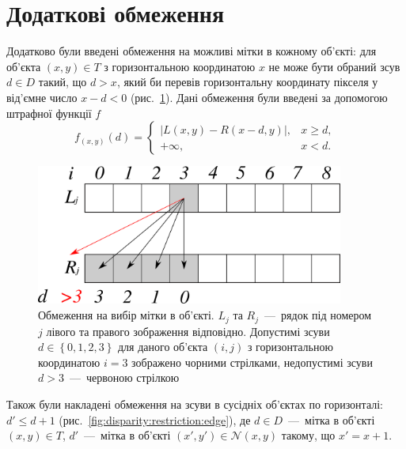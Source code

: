 \section{Додаткові обмеження}

Додатково були введені обмеження на можливі мітки в кожному об'єкті:
для об'єкта $\left( x, y \right) \in T$ з горизонтальною координатою $x$
не може бути обраний зсув $d \in D$ такий, що $d > x$,
який би перевів горизонтальну координату пікселя у від'ємне число
$x - d < 0$ (рис.~\ref{fig:disparity:restriction:vertex}).
Дані обмеження були введені за допомогою штрафної функції $f$
\begin{equation*}
    f_{\left(x, y \right)} \left( d \right) =
    \begin{cases}
        \left| L \left(x, y \right) - R \left(x - d, y \right) \right|,
            & x \ge d, \\
        + \infty, & x < d.
    \end{cases}
\end{equation*}

\begin{figure}[h]
  \centering
  \includegraphics[width=0.9\textwidth]{images/disparity_restriction_vertex}
  \caption{Обмеження на вибір мітки в об'єкті.
           $L_j$ та $R_j$~---~рядок під номером $j$
           лівого та правого зображення відповідно.
           Допустимі зсуви $d \in \left\{0, 1, 2, 3 \right\}$
           для даного об'єкта $\left(i, j \right)$
           з горизонтальною координатою $i = 3$
           зображено чорними стрілками,
           недопустимі зсуви $d > 3$~---~червоною стрілкою}
  \label{fig:disparity:restriction:vertex}
\end{figure}

Також були накладені обмеження на зсуви в сусідніх об'єктах по горизонталі:
$d' \le d + 1$ (рис.~\ref{fig:disparity:restriction:edge}),
де $d \in D$~---~мітка в об'єкті $\left(x, y \right) \in T$,
$d'$~---~мітка в об'єкті
$\left(x', y' \right) \in \mathcal{N} \left(x, y \right)$
такому, що $x' = x + 1$.

